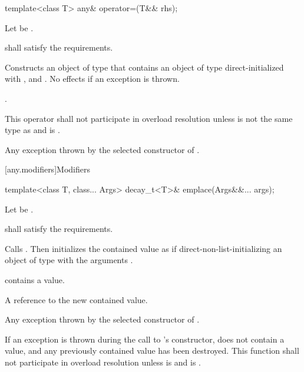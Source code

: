 %
\begin{itemdecl}
template<class T>
  any& operator=(T&& rhs);
\end{itemdecl}

\begin{itemdescr}
\pnum
Let  be .

\pnum
\requires
{} shall satisfy the  requirements.

\pnum
\effects
Constructs an object  of type  that contains an object of type  direct-initialized with , and .
No effects if an exception is thrown.

\pnum
\returns
{}.

\pnum
\remarks
This operator shall not participate in overload resolution unless
 is not the same type as  and
 is .

\pnum
\throws
Any exception thrown by the selected constructor of .
\end{itemdescr}

[any.modifiers]{Modifiers}

%
\begin{itemdecl}
template<class T, class... Args>
  decay_t<T>& emplace(Args&&... args);
\end{itemdecl}

\begin{itemdescr}
\pnum
Let  be .

\pnum
\requires
{} shall satisfy the  requirements.

\pnum
\effects Calls .
Then initializes the contained value as if direct-non-list-initializing
an object of type  with the arguments .

\pnum
\ensures {} contains a value.

\pnum
\returns
A reference to the new contained value.

\pnum
\throws Any exception thrown by the selected constructor of .

\pnum
\remarks If an exception is thrown during the call to 's constructor,
 does not contain a value, and any previously contained value
has been destroyed.
This function shall not participate in overload resolution unless
 is  and
 is .
\end{itemdescr}

